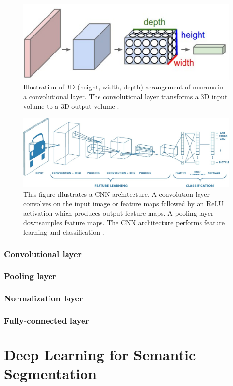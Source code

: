 	\begin{figure}[h]
		\centering
		\includegraphics[width=.4\linewidth]{images/conv_3dneurons}
		\caption{Illustration of 3D (height, width, depth) arrangement of neurons in a convolutional layer. The convolutional layer transforms a 3D input volume to a 3D output volume  \cite{cs231n}.}
		\label{Fig:cnn_neuron}
	\end{figure}
	
	\begin{figure}[h]
		\centering
		\includegraphics[width=1\linewidth]{images/cnn_matlab}
		\caption{This figure illustrates a CNN architecture. A convolution layer convolves on the input image or feature maps followed by an ReLU activation which produces output feature maps. A pooling layer downsamples feature maps. The CNN architecture performs feature learning and classification \cite{matlab_cnn}.}
		\label{Fig:cnn_arch}
	\end{figure}

\subsubsection{Convolutional layer}



\subsubsection{Pooling layer}

\subsubsection{Normalization layer}

\subsubsection{Fully-connected layer}

\section{Deep Learning for Semantic Segmentation}


